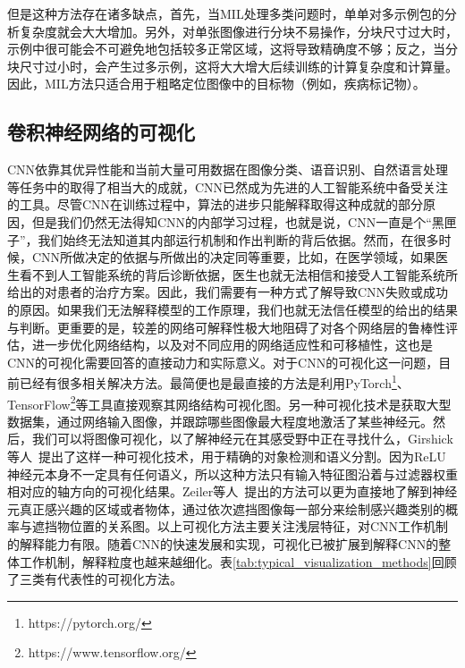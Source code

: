但是这种方法存在诸多缺点，首先，当MIL处理多类问题时，单单对多示例包的分析复杂度就会大大增加。另外，对单张图像进行分块不易操作，分块尺寸过大时，示例中很可能会不可避免地包括较多正常区域，这将导致精确度不够；反之，当分块尺寸过小时，会产生过多示例，这将大大增大后续训练的计算复杂度和计算量。因此，MIL方法只适合用于粗略定位图像中的目标物（例如，疾病标记物）。
\subsection{卷积神经网络的可视化}\label{subsec:visulization_methods}
CNN依靠其优异性能和当前大量可用数据在图像分类、语音识别、自然语言处理等任务中的取得了相当大的成就，CNN已然成为先进的人工智能系统中备受关注的工具。尽管CNN在训练过程中，算法的进步只能解释取得这种成就的部分原因，但是我们仍然无法得知CNN的内部学习过程，也就是说，CNN一直是个“黑匣子”，我们始终无法知道其内部运行机制和作出判断的背后依据。然而，在很多时候，CNN所做决定的依据与所做出的决定同等重要，比如，在医学领域，如果医生看不到人工智能系统的背后诊断依据，医生也就无法相信和接受人工智能系统所给出的对患者的治疗方案。因此，我们需要有一种方式了解导致CNN失败或成功的原因。如果我们无法解释模型的工作原理，我们也就无法信任模型的给出的结果与判断。更重要的是，较差的网络可解释性极大地阻碍了对各个网络层的鲁棒性评估，进一步优化网络结构，以及对不同应用的网络适应性和可移植性，这也是CNN的可视化需要回答的直接动力和实际意义。对于CNN的可视化这一问题，目前已经有很多相关解决方法。最简便也是最直接的方法是利用PyTorch\footnote{https://pytorch.org/}、TensorFlow\footnote{https://www.tensorflow.org/}等工具直接观察其网络结构可视化图。另一种可视化技术是获取大型数据集，通过网络输入图像，并跟踪哪些图像最大程度地激活了某些神经元。然后，我们可以将图像可视化，以了解神经元在其感受野中正在寻找什么，Girshick等人~\cite{girshick2014rich}提出了这样一种可视化技术，用于精确的对象检测和语义分割。因为ReLU神经元本身不一定具有任何语义，所以这种方法只有输入特征图沿着与过滤器权重相对应的轴方向的可视化结果。Zeiler等人~\cite{zeiler2014visualizing}提出的方法可以更为直接地了解到神经元真正感兴趣的区域或者物体，通过依次遮挡图像每一部分来绘制感兴趣类别的概率与遮挡物位置的关系图。以上可视化方法主要关注浅层特征，对CNN工作机制的解释能力有限。随着CNN的快速发展和实现，可视化已被扩展到解释CNN的整体工作机制，解释粒度也越来越细化。表\ref{tab:typical_visualization_methods}回顾了三类有代表性的可视化方法。
